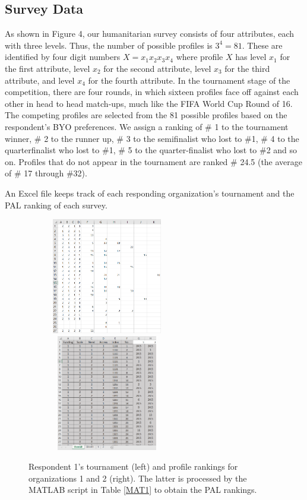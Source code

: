 \documentclass[a4paper, 12pt]{article}
\begin{document}
\subsection{Survey Data}

As shown in Figure 4, our humanitarian survey consists of four attributes, each with three levels. Thus, the number of possible profiles is $3^4=81$. These are identified by four digit numbers $X=x_1x_2x_3x_4$ where profile $X$ has level $x_1$ for the first attribute, level $x_2$ for the second attribute, level $x_3$ for the third attribute, and level $x_4$ for the fourth attribute. In the tournament stage of the competition, there are four rounds, in which sixteen profiles face off against each other in head to head match-ups, much like the FIFA World Cup Round of 16. The competing profiles are selected from the 81 possible profiles based on the respondent's BYO preferences. We assign a ranking of \# 1 to the tournament winner, \# 2 to the runner up, \# 3 to the semifinalist who lost to \#1, \# 4 to the quarterfinalist who lost to \#1, \# 5 to the quarter-finalist who lost to \#2 and so on. Profiles that do not appear in the tournament are ranked \# 24.5 (the average of \# 17 through \#32). 

An Excel file keeps track of each responding organization's tournament and the PAL ranking of each survey.


\begin{figure}[!htpb]
	\centering
	\includegraphics[width=2.75in, height=2in]{PAL2.png}
		\includegraphics[width=2.75in, height=2in]{PAL1.png}
	\caption{{\small Respondent 1's tournament (left) and profile rankings for organizations 1 and 2 (right). The latter is processed by the MATLAB script in Table \ref{MAT1} to obtain the PAL rankings. }}
	\label{AL}
\end{figure}
\end{document}
